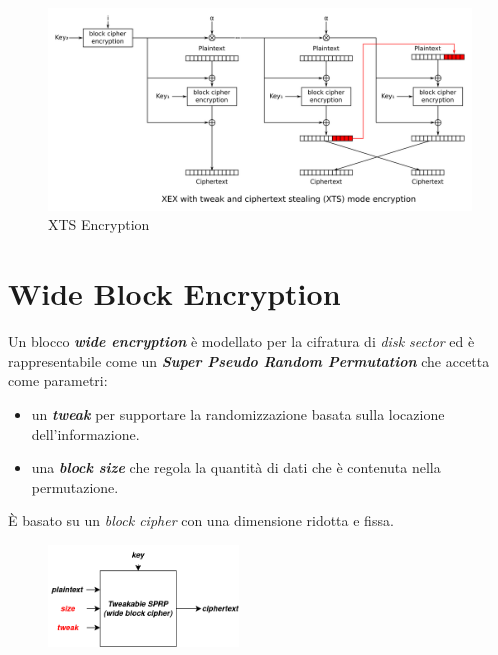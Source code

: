 \begin{flushleft}
\begin{itemize}[nosep]
        \begin{figure}[h]
            \centering
            \includegraphics[width=\textwidth]{img/xts.png}
            \caption{XTS Encryption}
        \end{figure}
    \end{itemize}
\end{flushleft}

\section{Wide Block Encryption}
\begin{flushleft}
    Un blocco \textbf{\textit{wide encryption}} è modellato per la cifratura di \textit{disk sector} ed è rappresentabile come un \textbf{\textit{Super Pseudo Random Permutation}} che accetta come parametri:
    \begin{itemize}[nosep]
        \item un \textbf{\textit{tweak}} per supportare la randomizzazione basata sulla locazione dell'informazione.
        \item una \textbf{\textit{block size}} che regola la quantità di dati che è contenuta nella permutazione.
    \end{itemize}
    È basato su un \textit{block cipher} con una dimensione ridotta e fissa.

    \begin{figure}[h]
        \centering
        \includegraphics[width=0.45\textwidth]{img/wide_block.png}
    \end{figure}
\end{flushleft}